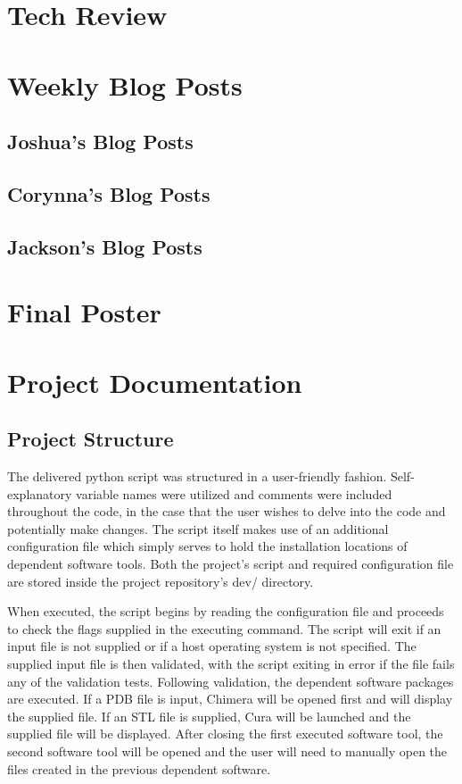 \documentclass[letterpaper, onecolumn, draftclsnofoot, 10pt, compsoc]{IEEEtran}
\begin{document}
\begin{singlespace}
\begin{itemize}
	\end{itemize}
	\section{Tech Review}
	
	
	\section{Weekly Blog Posts}
	\subsection{Joshua's Blog Posts}
	
	\subsection{Corynna's Blog Posts}
	
	\subsection{Jackson's Blog Posts}
	
	
	\section{Final Poster}
	
	
	\section{Project Documentation}
	\subsection{Project Structure} %
	The delivered python script was structured in a user-friendly fashion. Self-explanatory variable names were utilized and comments were included throughout the code, in the case that the user wishes to delve into the code and potentially make changes. The script itself makes use of an additional configuration file which simply serves to hold the installation locations of dependent software tools. Both the project's script and required configuration file are stored inside the project repository's dev/ directory. \par
	When executed, the script begins by reading the configuration file and proceeds to check the flags supplied in the executing command. The script will exit if an input file is not supplied or if a host operating system is not specified. The supplied input file is then validated, with the script exiting in error if the file fails any of the validation tests. Following validation, the dependent software packages are executed. If a PDB file is input, Chimera will be opened first and will display the supplied file. If an STL file is supplied, Cura will be launched and the supplied file will be displayed. After closing the first executed software tool, the second software tool will be opened and the user will need to manually open the files created in the previous dependent software.

\end{singlespace}
\end{document}
